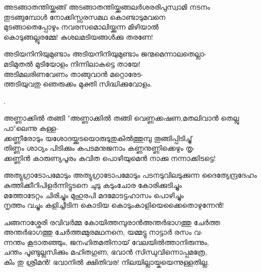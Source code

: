 \begin{enumerate}

\begin{slokam}{\VSk}{\KKT}{അടങ്ങാതന്തിയ്ക്കങ്ങ്}
അടങ്ങാതന്തിയ്ക്കങ്ങലർശരരിപുസ്വാമി നടനം\\
തുടങ്ങുമ്പോള്‍ നോക്കിസ്സരസമഥ കൊണ്ടാടുമവനെ\\
മുടങ്ങാതെപ്പോഴും നവരസമൊലിയ്ക്കുന്ന മിഴിയാൽ\\
കൊടുങ്ങല്ലൂരമ്മേ! കുശലമടിയങ്ങള്‍ക്കു തരണേ!
\end{slokam}


\begin{slokam}{\VMl}{\Ull}{അടിയനിനിയുമുണ്ടാം}
അടിയനിനിയുമുണ്ടാം ജന്മമെന്നാലതെല്ലാ-\\
മടിമുതൽ മുടിയോളം നിന്നിലാകട്ടെ തായേ!\\
അടിമലരിണവേണം താങ്ങുവാൻ മറ്റൊരേട-\\
ത്തടിയുവതു ഞെരുക്കം മുക്തി സിദ്ധിക്കുവോളം.
\end{slokam}


.


\begin{slokam}{\VSr}{\SVL}{അണ്ണാക്കിൽ തങ്ങി}
"അണ്ണാക്കിൽ തങ്ങി വെണ്ണക്കഷണ,മതലിവാൻ തെല്ലു പാ"ലെന്നു കള്ള-\\
ക്കണ്ണീരോടും യശോദയ്ക്കുടയൊരുടുതുകിൽത്തുമ്പു തൂങ്ങിപ്പിടിച്ചു്‌\\
തിണ്ണം ശാഠ്യം പിടിക്കും കപടമനുജനാം കണ്ണനുണ്ണിക്കെഴും തൃ-\\
ക്കണ്ണിൻ കാരുണ്യപൂരം കവിത പൊഴിയുമെൻ നാക്കു നന്നാക്കിടട്ടെ!
\end{slokam}


\begin{slokam}{\VSr}{\Unk}{അത്യുഗ്രാടോപമോടും}
അത്യുഗ്രാടോപമോടും പടനടുവിലടുക്കുന്ന ദൈത്യേന്ദ്രദേഹം\\
കുത്തിക്കീറിപിളർന്നിട്ടുടനെ ചുടു കടുംചോര കോരിക്കുടിച്ചും\\
മത്തോടേറ്റം ചിരിച്ചും മുഹുരപി മദമോടട്ടഹാസം പൊഴിച്ചും\\
നൃത്തം വച്ചും കളിച്ചീടിന കൊടിയ കൊടുംകാളിയെക്കൈതൊഴുന്നേൻ!
\end{slokam}




\begin{slokam}{\VSr}{ചങ്ങനാശ്ശേരി രവിവർമ്മ കോയിത്തമ്പുരാൻ}{അന്തർഭാഗത്തു ചേർത്ത}
അന്തർഭാഗത്തു ചേർത്തമ്മുരമഥനനെ, യമ്മട്ടു നാട്ടാർ രസം വ-\\
ന്നന്തം കൂടാതഞ്ഞും, ജനഹിതമതിനായ്‌ വേലയിൽത്താനിരുന്നും,\\
ചന്തം പൂണ്ടുല്ലസിക്കും മഹിതഗുണ, ഭവാൻ സിന്ധുവിന്നൊപ്പമത്രേ,\\
കിം തു ശ്രീമൻ! ഭവാനിൽ ക്ഷിതിവര! നിലയില്ലായ്കയെന്നുള്ളതില്ല.
\end{slokam}


\end{enumerate}
